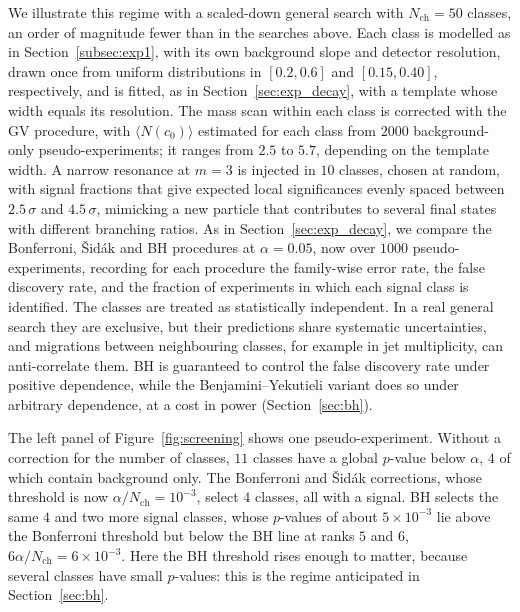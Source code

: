 We illustrate this regime with a scaled-down general search with $N_\text{ch}=50$ classes, an order of magnitude fewer than in the searches above. Each class is modelled as in Section~\ref{subsec:exp1}, with its own background slope and detector resolution, drawn once from uniform distributions in $[0.2,0.6]$ and $[0.15,0.40]$, respectively, and is fitted, as in Section~\ref{sec:exp_decay}, with a template whose width equals its resolution. The mass scan within each class is corrected with the GV procedure, with $\langle N(c_0)\rangle$ estimated for each class from $2000$ background-only pseudo-experiments; it ranges from $2.5$ to $5.7$, depending on the template width. A narrow resonance at $m=3$ is injected in $10$ classes, chosen at random, with signal fractions that give expected local significances evenly spaced between $2.5\,\sigma$ and $4.5\,\sigma$, mimicking a new particle that contributes to several final states with different branching ratios. As in Section~\ref{sec:exp_decay}, we compare the Bonferroni, \v{S}id\'ak and BH procedures at $\alpha=0.05$, now over $1000$ pseudo-experiments, recording for each procedure the family-wise error rate, the false discovery rate, and the fraction of experiments in which each signal class is identified. The classes are treated as statistically independent. In a real general search they are exclusive, but their predictions share systematic uncertainties, and migrations between neighbouring classes, for example in jet multiplicity, can anti-correlate them. BH is guaranteed to control the false discovery rate under positive dependence, while the Benjamini--Yekutieli variant does so under arbitrary dependence, at a cost in power (Section~\ref{sec:bh}).

The left panel of Figure~\ref{fig:screening} shows one pseudo-experiment. Without a correction for the number of classes, $11$ classes have a global $p$-value below $\alpha$, $4$ of which contain background only. The Bonferroni and \v{S}id\'ak corrections, whose threshold is now $\alpha/N_\text{ch}=10^{-3}$, select $4$ classes, all with a signal. BH selects the same $4$ and two more signal classes, whose $p$-values of about $5\times10^{-3}$ lie above the Bonferroni threshold but below the BH line at ranks $5$ and $6$, $6\alpha/N_\text{ch}=6\times10^{-3}$. Here the BH threshold rises enough to matter, because several classes have small $p$-values: this is the regime anticipated in Section~\ref{sec:bh}.

